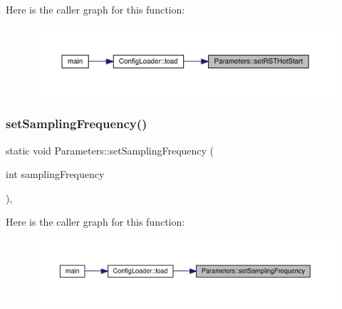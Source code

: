 Here is the caller graph for this function\+:\nopagebreak
\begin{figure}[H]
\begin{center}
\leavevmode
\includegraphics[width=350pt]{class_parameters_a84d9a6f8a32bbe13f7abe045453700a0_icgraph}
\end{center}
\end{figure}
\mbox{\label{class_parameters_ae9fa4bf77247404758c43179849ae3bf}} 
\subsubsection{\texorpdfstring{setSamplingFrequency()}{setSamplingFrequency()}}
{\footnotesize\ttfamily static void Parameters\+::set\+Sampling\+Frequency (\begin{DoxyParamCaption}\item[{int}]{sampling\+Frequency }\end{DoxyParamCaption})\hspace{0.3cm}{\ttfamily [inline]}, {\ttfamily [static]}}

Here is the caller graph for this function\+:\nopagebreak
\begin{figure}[H]
\begin{center}
\leavevmode
\includegraphics[width=350pt]{class_parameters_ae9fa4bf77247404758c43179849ae3bf_icgraph}
\end{center}
\end{figure}
\mbox{\label{class_parameters_a7ab55c1529015de4c5c182cfa9f004e8}} 
